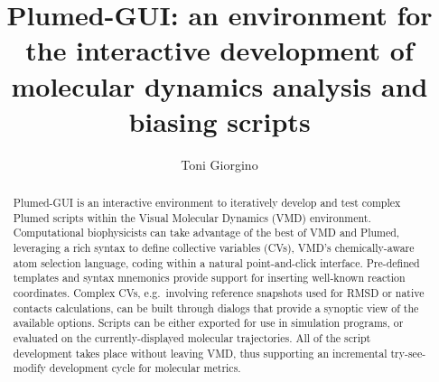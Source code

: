 \documentclass[preprint,review,11pt]{elsarticle}
\newcommand{\mytitle}{Plumed-GUI: an environment for the interactive development 
  of molecular dynamics analysis and biasing scripts}
\begin{document}
\begin{frontmatter}


\title{\mytitle}
\author{Toni Giorgino}
\address{Institute of Biomedical Engineering (ISIB),\\ 
National Research Council of Italy (CNR),\\
Corso Stati Uniti 4, I-35127 Padua, Italy}




\begin{abstract}
  Plumed-GUI is an interactive environment to iteratively develop and
  test complex Plumed scripts within the Visual Molecular Dynamics
  (VMD) environment. Computational biophysicists can take advantage of
  the best of VMD and Plumed, leveraging a rich syntax to define
  collective variables (CVs), VMD's chemically-aware atom selection
  language, coding within a natural point-and-click interface.
  Pre-defined templates and syntax mnemonics provide support for
  inserting well-known reaction coordinates. Complex CVs,
  e.g.\ involving reference snapshots used for RMSD or native contacts
  calculations, can be built through dialogs that provide a synoptic
  view of the available options.  Scripts can be either exported for
  use in simulation programs, or evaluated on the currently-displayed
  molecular trajectories. All of the script development takes place
  without leaving VMD, thus supporting an incremental try-see-modify
  development cycle for molecular metrics.
\end{abstract}


\end{frontmatter}
\end{document}
